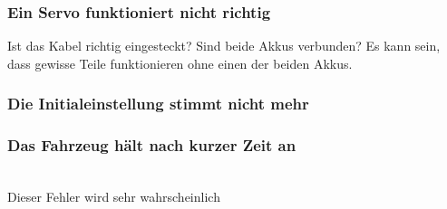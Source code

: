 \subsubsection{Ein Servo funktioniert nicht richtig}
Ist das Kabel richtig eingesteckt?
Sind beide Akkus verbunden? Es kann sein, dass gewisse Teile funktionieren ohne einen der beiden Akkus.
\subsubsection{Die Initialeinstellung stimmt nicht mehr}
\subsubsection{Das Fahrzeug hält nach kurzer Zeit an}\\[0.2cm]
Dieser Fehler wird sehr wahrscheinlich 


